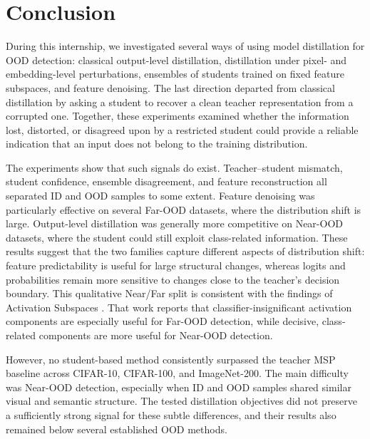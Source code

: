 \section{Conclusion}

\headingindent
During this internship, we investigated several ways of using model
distillation for OOD detection: classical output-level distillation,
distillation under pixel- and embedding-level perturbations, ensembles of
students trained on fixed feature subspaces, and feature denoising. The last
direction departed from classical distillation by asking a student to recover
a clean teacher representation from a corrupted one. Together, these
experiments examined whether the information lost, distorted, or disagreed
upon by a restricted student could provide a reliable indication that an
input does not belong to the training distribution.

The experiments show that such signals do exist. Teacher--student mismatch,
student confidence, ensemble disagreement, and feature reconstruction all
separated ID and OOD samples to some extent. Feature denoising was particularly
effective on several Far-OOD datasets, where the distribution shift is large.
Output-level distillation was generally more competitive on Near-OOD datasets,
where the student could still exploit class-related information. These results
suggest that the two families capture different aspects of distribution shift:
feature predictability is useful for large structural changes, whereas logits
and probabilities remain more sensitive to changes close to the teacher's
decision boundary. This qualitative Near/Far split is consistent with the
findings of Activation Subspaces \cite{zongur2025actsub}. That work reports
that classifier-insignificant activation components are especially useful for
Far-OOD detection, while decisive, class-related components are more useful
for Near-OOD detection.

However, no student-based method consistently surpassed the teacher MSP
baseline across CIFAR-10, CIFAR-100, and ImageNet-200. The main difficulty was
Near-OOD detection, especially when ID and OOD samples shared similar visual
and semantic structure. The tested distillation objectives did not preserve a
sufficiently strong signal for these subtle differences, and their results
also remained below several established OOD methods.


